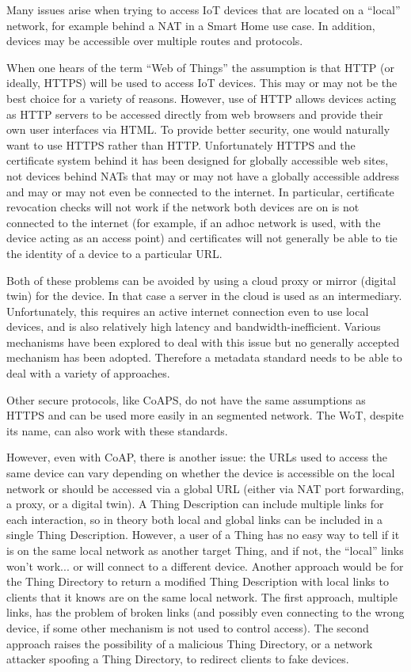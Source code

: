 Many issues arise when trying to access IoT devices
that are located on a ``local'' network,
for example behind a NAT in a Smart Home use case.
In addition, devices may be accessible over multiple
routes and protocols.

When one hears of the term ``Web of Things'' the
assumption is that HTTP (or ideally, HTTPS) will be used to
access IoT devices. This may or may not be the best choice
for a variety of reasons.  However, use of HTTP
allows devices acting as HTTP servers to be accessed directly
from web browsers and provide their own user
interfaces via HTML.  To provide better security, one would
naturally want to use HTTPS rather than HTTP.
Unfortunately HTTPS and the certificate system behind it has
been designed for globally accessible web sites, not devices
behind NATs that may or may not have a globally accessible
address and may or may not even be connected to the internet.
In particular, certificate revocation checks will not work if
the network both devices are on is not connected to the internet
(for example, if an adhoc network is used, with the device acting as
an access point) and certificates will not generally be able 
to tie the identity of a device to a particular URL. 

Both of these problems can be avoided by using a cloud proxy
or mirror (digital twin) for the device.  In that case a server
in the cloud is used as an intermediary.  Unfortunately,
this requires an active internet connection even to use 
local devices, and is also relatively high latency and
bandwidth-inefficient.
Various mechanisms have been explored to deal with this issue\cite{httpslocal2017}
but no generally accepted mechanism has been adopted.
Therefore a metadata standard needs to be able to deal with a variety
of approaches.

Other secure protocols, like CoAPS, 
do not have the same assumptions as HTTPS and can be used
more easily in an segmented network.  
The WoT, despite its name, can also work with these standards.

However, even with CoAP, there is another issue: the URLs
used to access the same device can vary depending on whether the
device is accessible on the local network or should be accessed
via a global URL (either via NAT port forwarding, a proxy, or
a digital twin).  A Thing Description can include multiple links
for each interaction, so in theory both local and global links
can be included in a single Thing Description.
However, a user of a Thing has no easy way to tell if it is on
the same local network as another target Thing,
and if not, the ``local'' links
won't work... or will connect to a different device.  Another
approach would be for the Thing Directory to return a modified
Thing Description with local links to clients that it knows 
are on the same local network.
The first approach, multiple
links, has the problem of broken links (and possibly even 
connecting to the wrong device, if some other mechanism is not
used to control access).
The second approach raises the possibility
of a malicious Thing Directory, or a network attacker spoofing a
Thing Directory, to redirect clients to fake devices.

